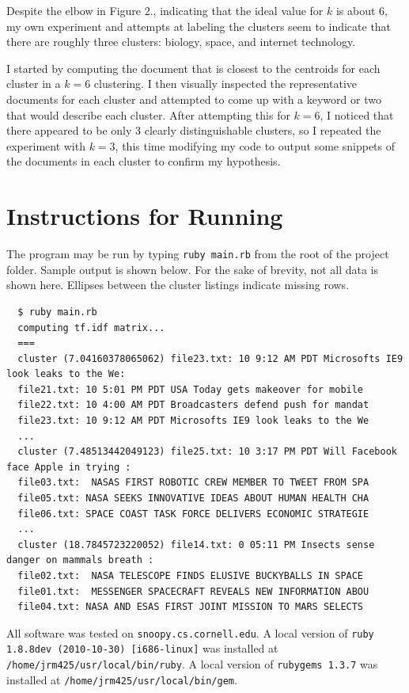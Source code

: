 \documentclass[12pt]{article}
\begin{document}
Despite the elbow in Figure 2., indicating that the ideal value for $k$ is about 6, my own experiment and attempts at labeling the clusters seem to indicate that there are roughly three clusters: biology, space, and internet technology.

I started by computing the document that is closest to the centroids for each cluster in a $k = 6$ clustering. I then visually inspected the representative documents for each cluster and attempted to come up with a keyword or two that would describe each cluster. After attempting this for $k = 6$, I noticed that there appeared to be only 3 clearly distinguishable clusters, so I repeated the experiment with $k = 3$, this time modifying my code to output some snippets of the documents in each cluster to confirm my hypothesis.

\newpage
\section{Instructions for Running} %
\label{sec:instructions_for_running}
The program may be run by typing \texttt{ruby main.rb} from the root of the project folder. Sample output is shown below. For the sake of brevity, not all data is shown here. Ellipses between the cluster listings indicate missing rows.

\begin{lstlisting}
  $ ruby main.rb 
  computing tf.idf matrix...
  ===
  cluster (7.04160378065062) file23.txt: 10 9:12 AM PDT Microsofts IE9 look leaks to the We:
  file21.txt: 10 5:01 PM PDT USA Today gets makeover for mobile 
  file22.txt: 10 4:00 AM PDT Broadcasters defend push for mandat
  file23.txt: 10 9:12 AM PDT Microsofts IE9 look leaks to the We
  ...
  cluster (7.48513442049123) file25.txt: 10 3:17 PM PDT Will Facebook face Apple in trying :
  file03.txt:  NASAS FIRST ROBOTIC CREW MEMBER TO TWEET FROM SPA
  file05.txt: NASA SEEKS INNOVATIVE IDEAS ABOUT HUMAN HEALTH CHA
  file06.txt: SPACE COAST TASK FORCE DELIVERS ECONOMIC STRATEGIE
  ...
  cluster (18.7845723220052) file14.txt: 0 05:11 PM Insects sense danger on mammals breath :
  file02.txt:  NASA TELESCOPE FINDS ELUSIVE BUCKYBALLS IN SPACE 
  file01.txt:  MESSENGER SPACECRAFT REVEALS NEW INFORMATION ABOU
  file04.txt: NASA AND ESAS FIRST JOINT MISSION TO MARS SELECTS 
\end{lstlisting}

All software was tested on \texttt{snoopy.cs.cornell.edu}. A local version of \texttt{ruby 1.8.8dev (2010-10-30) [i686-linux]} was installed at \newline
\texttt{/home/jrm425/usr/local/bin/ruby}. A local version of \texttt{rubygems 1.3.7} was installed at \texttt{/home/jrm425/usr/local/bin/gem}.
\end{document}
